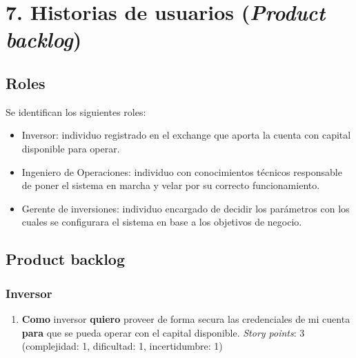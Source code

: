 \documentclass[
    11pt, %
]{charter}
\begin{document}
    \section{7. Historias de usuarios (\textit{Product backlog})}
    \subsection{Roles}
    Se identifican los siguientes roles:
    \begin{itemize}
    \item Inversor: individuo registrado en el exchange que aporta la cuenta con capital disponible para operar.
    \item Ingeniero de Operaciones: individuo con conocimientos técnicos responsable de poner el sistema en marcha y velar por su correcto funcionamiento.
    \item Gerente de inversiones: individuo encargado de decidir los parámetros con los cuales se configurara el sistema en base a los objetivos de negocio.
    \end{itemize}

    \label{sec:backlog}
    \subsection{Product backlog}
    \subsubsection{Inversor}
    \begin{enumerate}
    \item \textbf{Como} inversor \textbf{quiero} proveer de forma secura las credenciales de mi cuenta \textbf{para} que se pueda operar con el capital disponible.
      \textit{Story points}: 3  (complejidad: 1, dificultad: 1, incertidumbre: 1)
    \end{enumerate}
\end{document}
